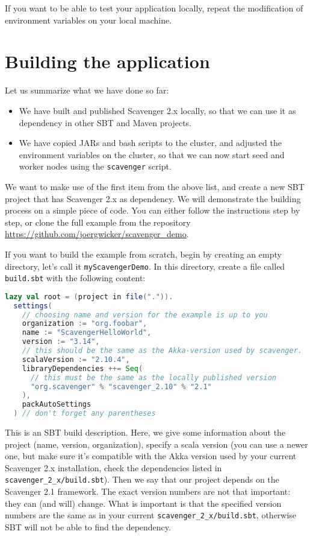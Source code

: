 \documentclass{scrbook}
\begin{document}
If you want to be able to test your application locally, 
repeat the modification of environment variables on your local 
machine.

\section{Building the application}
Let us summarize what we have done so far:
\begin{itemize}
  \item We have built and published Scavenger 2.x locally, so 
    that we can use it as dependency in other SBT and Maven 
    projects.
  \item We have copied JARs and bash scripts to the cluster,
    and adjusted the environment variables on the 
    cluster, so that we can now start seed and worker nodes
    using the \lstinline{scavenger} script.
\end{itemize}
We want to make use of the first item from the above list, 
and create a new SBT project that has Scavenger 2.x 
as dependency. We will demonstrate the building process on
a simple piece of code.
You can either follow the instructions step by step, or 
clone the full example from the repository
\url{https://github.com/joergwicker/scavenger_demo}.

If you want to build the example from scratch, 
begin by creating an empty directory, let's call it 
\lstinline{myScavengerDemo}.
In this directory, create a file called \lstinline{build.sbt}
with the following content:
\begin{lstlisting}[language=scala]
lazy val root = (project in file(".")).
  settings(
    // choosing name and version for the example is up to you
    organization := "org.foobar", 
    name := "ScavengerHelloWorld",
    version := "3.14", 
    // this should be the same as the Akka-version used by scavenger.
    scalaVersion := "2.10.4", 
    libraryDependencies ++= Seq(
      // this must be the same as the locally published version
      "org.scavenger" % "scavenger_2.10" % "2.1" 
    ),
    packAutoSettings
  ) // don't forget any parentheses
\end{lstlisting}
This is an SBT build description. Here, we give some information about the
project (name, version, organization), specify a scala version (you can 
use a newer one, but make sure it's compatible with the Akka version used
by your current Scavenger 2.x installation, check the dependencies listed
in \lstinline{scavenger_2_x/build.sbt}). Then we say that our project 
depends on the Scavenger 2.1 framework. The exact version numbers are not
that important: they can (and will) change. What is important is that 
the specified version numbers are the same as in your current
\lstinline{scavenger_2_x/build.sbt}, otherwise SBT will not be able 
to find the dependency.
\end{document}
